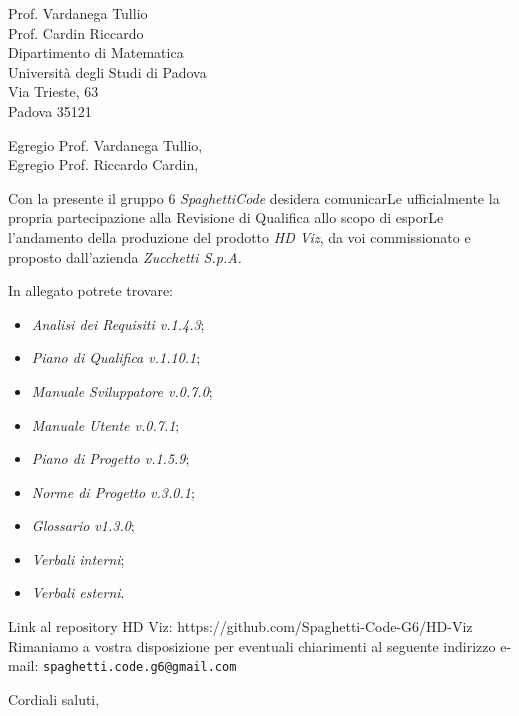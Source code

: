 \documentclass[a4paper,12pt]{letteracdp}
\date{17 giugno 2021}
\begin{document}
\begin{letter}{
\vspace*{-2\baselineskip}
Prof. Vardanega Tullio \\
Prof. Cardin Riccardo \\
Dipartimento di Matematica \\
Università degli Studi di Padova \\
Via Trieste, 63 \\
Padova 35121}

\opening{Egregio Prof. Vardanega Tullio, \\
\noindent Egregio Prof. Riccardo Cardin,}

\begin{flushleft}
Con la presente il gruppo 6 \textit{SpaghettiCode} desidera comunicarLe ufficialmente la propria partecipazione alla Revisione di 
Qualifica allo scopo di esporLe l'andamento della produzione del prodotto \textit{HD Viz}, da voi commissionato e proposto 
dall'azienda \textit{Zucchetti S.p.A.}

In allegato potrete trovare:
\end{flushleft}

\begin{itemize}
\item \emph{Analisi dei Requisiti v.1.4.3};
\item \emph{Piano di Qualifica v.1.10.1};
\item \emph{Manuale Sviluppatore v.0.7.0};
\item \emph{Manuale Utente v.0.7.1};
\item \emph{Piano di Progetto v.1.5.9};
\item \emph{Norme di Progetto v.3.0.1};
\item \emph{Glossario v1.3.0};
\item \emph{Verbali interni};
\item \emph{Verbali esterni}.
\end{itemize}

\begin{flushleft}
Link al repository HD Viz: https://github.com/Spaghetti-Code-G6/HD-Viz \\

Rimaniamo a vostra disposizione per eventuali chiarimenti al seguente indirizzo e-mail: {\texttt{spaghetti.code.g6@gmail.com}}
\end{flushleft}

\closing{Cordiali saluti,}

\end{letter}
\end{document}
